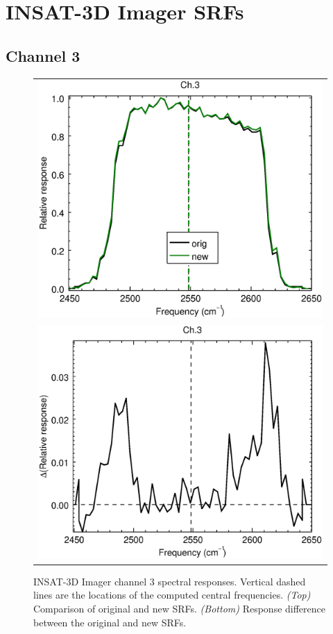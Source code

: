 \section{INSAT-3D Imager SRFs}
\label{app.imgr_srf_data_plots}

\subsection{Channel 3}
\begin{figure}[H]
  \centering
  \begin{tabular}{c}
    \includegraphics[scale=0.55]{graphics/imgr/srf/imgr_insat3d-3.eps} \\
    \includegraphics[scale=0.55]{graphics/imgr/srf/imgr_insat3d-3.difference.eps}
  \end{tabular}
  \caption{INSAT-3D Imager channel 3 spectral responses. Vertical dashed lines are the locations of the computed central frequencies. \emph{(Top)} Comparison of original and new SRFs. \emph{(Bottom)} Response difference between the original and new SRFs.}
  \label{fig:imgr_ch3}
\end{figure}


